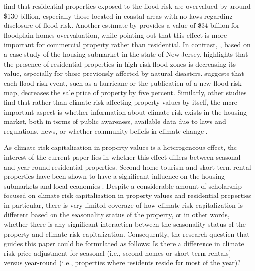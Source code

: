 \documentclass[11pt]{article}
\begin{document}
\textcite{gourevitchetal2023-UnpricedClimateRisk} find that residential properties exposed to the flood risk are overvalued by around \$130 billion, especially those located in coastal areas with no laws regarding disclosure of flood risk. Another estimate by \textcite{hinoburke2020-DoesInformationClimate} provides a value of \$34 billion for floodplain homes overvaluation, while pointing out that this effect is more important for commercial property rather than residential. In contrast, \textcite{putra2017-RealPropertyMarket}, based on a case study of the housing submarket in the state of New Jersey, highlights that the presence of residential properties in high-risk flood zones is decreasing its value, especially for those previously affected by natural disasters. \textcite{gibsonetal2017-ClimateChangeFlood} suggests that each flood risk event, such as a hurricane or the publication of a new flood risk map, decreases the sale price of property by five percent. Similarly, other studies find that rather than climate risk affecting property values by itself, the more important aspect is whether information about climate risk exists in the housing market, both in terms of public awareness, available data due to laws and regulations, news, or whether community beliefs in climate change \parencite{hinoburke2020-DoesInformationClimate, buntenkahn2014-ImpactEmergingClimate, chen2025-DoesPublicConcern, baldaufetal2020-DoesClimateChange}. 

As climate risk capitalization in property values is a heterogeneous effect, the interest of the current paper lies in whether this effect differs between seasonal and year-round residential properties. Second home tourism and short-term rental properties have been shown to have a significant influence on the housing submarkets and local economies \parencite{wassmer2022-ValueProximityVacation, collado-gonzalezetal2025-SecondHomesTourism,perles-ribesetal2025-RelationshipShorttermRentals, gil2024-NotGentrificationNot, valenzuela-martinetal2025-ExplanatoryFactorsDistribution}. Despite a considerable amount of scholarship focused on climate risk capitalization in property values and residential properties in particular, there is very limited coverage of how climate risk capitalization is different based on the seasonality status of the property, or in other words, whether there is any significant interaction between the seasonality status of the property and climate risk capitalization. Consequently, the research question that guides this paper could be formulated as follows: Is there a difference in climate risk price adjustment for seasonal (i.e., second homes or short-term rentals) versus year-round (i.e., properties where residents reside for most of the year)? 
\end{document}
